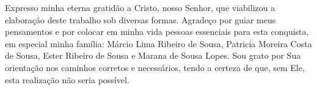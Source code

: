 \begin{agradecimentos}
Expresso minha eterna gratidão a Cristo, nosso Senhor, que viabilizou a elaboração deste trabalho sob diversas formas. Agradeço por guiar meus pensamentos e por colocar em minha vida pessoas essenciais para esta conquista, em especial minha família: Márcio Lima Ribeiro de Sousa, Patricia Moreira Costa de Sousa, Ester Ribeiro de Sousa e Marana de Sousa Lopes. Sou grato por Sua orientação nos caminhos corretos e necessários, tendo a certeza de que, sem Ele, esta realização não seria possível.
\end{agradecimentos}
